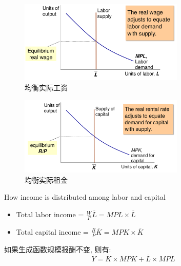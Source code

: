 \begin{figure}[htbp]
    \centering
    \includegraphics[width=0.7\textwidth]{image/equilibriumRW.png}
    \caption{均衡实际工资}
\end{figure}
\begin{figure}[htbp]
    \centering
    \includegraphics[width=0.7\textwidth]{image/equilibriumRRR.png}
    \caption{均衡实际租金}
\end{figure}
\begin{problem}
    How income is distributed among labor and capital
\end{problem}
\begin{itemize}
    \item Total labor income = $ \frac{W}{P}\overline{L}  = MPL \times \overline{L}$
    \item Total capital income = $ \frac{R}{P}\overline{K}  = MPK \times \overline{K}$
\end{itemize}
\begin{theorem}
    如果生成函数规模报酬不变, 则有: $$\overline{Y} = \overline{K} \times MPK + \overline{L} \times MPL$$
\end{theorem}

